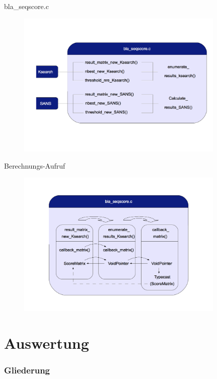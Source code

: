 \documentclass[xcolor=dvipsnames, aspectratio=1610]{beamer}
\begin{document}
\begin{frame}{bla\_seqscore.c}
  \begin{figure}[h]
    \includegraphics[height=7cm]{img/dia2.png}
  \end{figure}
\end{frame}

\begin{frame}{Berechnungs-Aufruf}
  \begin{figure}[h]
    \includegraphics[height=7cm]{img/dia3.png}
  \end{figure}
\end{frame}

\section{Auswertung}
  \begin{frame} 
    \frametitle{Gliederung}
    \tableofcontents[currentsection]
  \end{frame}
  
\end{document}
